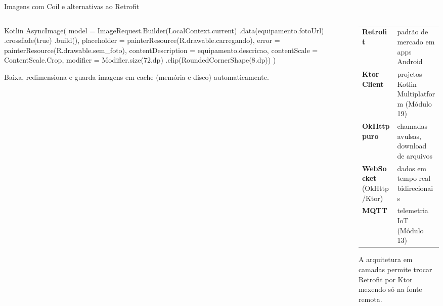 \documentclass[aspectratio=169,10pt]{beamer}
\begin{document}
\begin{frame}[fragile]{Imagens com Coil e alternativas ao Retrofit}
  \begin{columns}[T]
    \begin{column}{0.5\textwidth}
\begin{codigo}[title=Coil em Compose]{Kotlin}
AsyncImage(
  model = ImageRequest.Builder(LocalContext.current)
    .data(equipamento.fotoUrl)
    .crossfade(true)
    .build(),
  placeholder = painterResource(R.drawable.carregando),
  error = painterResource(R.drawable.sem_foto),
  contentDescription = equipamento.descricao,
  contentScale = ContentScale.Crop,
  modifier = Modifier.size(72.dp)
    .clip(RoundedCornerShape(8.dp))
)
\end{codigo}
      \begin{conceito}[Coil]
        Baixa, redimensiona e guarda imagens em cache (memória e disco) automaticamente.
      \end{conceito}
    \end{column}
    \begin{column}{0.48\textwidth}
      \scriptsize
      \begin{tabularx}{\linewidth}{@{}l L@{}}
        \toprule
         &  \\
        \midrule
        \textbf{Retrofit} & padrão de mercado em apps Android \\
        \textbf{Ktor Client} & projetos Kotlin Multiplatform (Módulo 19) \\
        \textbf{OkHttp puro} & chamadas avulsas, download de arquivos \\
        \textbf{WebSocket} (OkHttp/Ktor) & dados em tempo real bidirecionais \\
        \textbf{MQTT} & telemetria IoT (Módulo 13) \\
        \bottomrule
      \end{tabularx}
      \begin{dica}
        A arquitetura em camadas permite trocar Retrofit por Ktor mexendo só na fonte remota.
      \end{dica}
    \end{column}
  \end{columns}
\end{frame}
\end{document}
